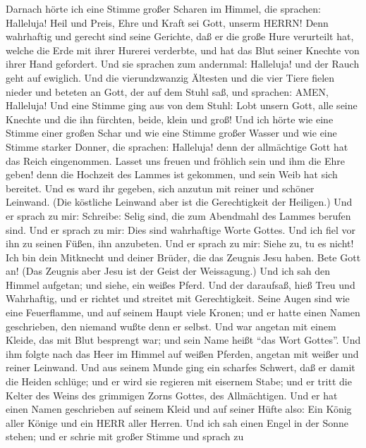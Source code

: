  Darnach hörte ich eine Stimme großer Scharen im Himmel, die
sprachen: Halleluja! Heil und Preis, Ehre und Kraft sei Gott, unserm
HERRN!  Denn wahrhaftig und gerecht sind seine Gerichte, daß
er die große Hure verurteilt hat, welche die Erde mit ihrer Hurerei
verderbte, und hat das Blut seiner Knechte von ihrer Hand gefordert.
 Und sie sprachen zum andernmal: Halleluja! und der Rauch
geht auf ewiglich.  Und die vierundzwanzig Ältesten und die
vier Tiere fielen nieder und beteten an Gott, der auf dem Stuhl saß, und
sprachen: AMEN, Halleluja!  Und eine Stimme ging aus von dem
Stuhl: Lobt unsern Gott, alle seine Knechte und die ihn fürchten, beide,
klein und groß!  Und ich hörte wie eine Stimme einer großen
Schar und wie eine Stimme großer Wasser und wie eine Stimme starker
Donner, die sprachen: Halleluja! denn der allmächtige Gott hat das Reich
eingenommen.  Lasset uns freuen und fröhlich sein und ihm
die Ehre geben! denn die Hochzeit des Lammes ist gekommen, und sein Weib
hat sich bereitet.  Und es ward ihr gegeben, sich anzutun
mit reiner und schöner Leinwand. (Die köstliche Leinwand aber ist die
Gerechtigkeit der Heiligen.)  Und er sprach zu mir:
Schreibe: Selig sind, die zum Abendmahl des Lammes berufen sind. Und er
sprach zu mir: Dies sind wahrhaftige Worte Gottes.  Und ich
fiel vor ihn zu seinen Füßen, ihn anzubeten. Und er sprach zu mir: Siehe
zu, tu es nicht! Ich bin dein Mitknecht und deiner Brüder, die das
Zeugnis Jesu haben. Bete Gott an! (Das Zeugnis aber Jesu ist der Geist
der Weissagung.)  Und ich sah den Himmel aufgetan; und
siehe, ein weißes Pferd. Und der daraufsaß, hieß Treu und Wahrhaftig,
und er richtet und streitet mit Gerechtigkeit.  Seine Augen
sind wie eine Feuerflamme, und auf seinem Haupt viele Kronen; und er
hatte einen Namen geschrieben, den niemand wußte denn er selbst.
 Und war angetan mit einem Kleide, das mit Blut besprengt
war; und sein Name heißt ``das Wort Gottes''.  Und ihm
folgte nach das Heer im Himmel auf weißen Pferden, angetan mit weißer
und reiner Leinwand.  Und aus seinem Munde ging ein
scharfes Schwert, daß er damit die Heiden schlüge; und er wird sie
regieren mit eisernem Stabe; und er tritt die Kelter des Weins des
grimmigen Zorns Gottes, des Allmächtigen.  Und er hat einen
Namen geschrieben auf seinem Kleid und auf seiner Hüfte also: Ein König
aller Könige und ein HERR aller Herren.  Und ich sah einen
Engel in der Sonne stehen; und er schrie mit großer Stimme und sprach zu
